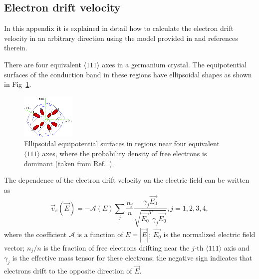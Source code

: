 \documentclass[epj]{svjour}
\begin{document}
\begin{appendices}

\section{Electron drift velocity}
\label{s:elec} 
\setcounter{equation}{0}
\renewcommand{\theequation}{A.\arabic{equation}}
\setcounter{figure}{0}
\renewcommand{\thefigure}{A.\arabic{figure}}
\setcounter{footnote}{0}

In this appendix it is explained in detail how to calculate the
electron drift velocity in an arbitrary direction using the model
provided in \cite{miha} and references therein.

There are four equivalent $\langle 111 \rangle$ axes in a germanium
crystal. The equipotential surfaces of the conduction band in these
regions have ellipsoidal shapes as shown in Fig~\ref{f:valley}.

\begin{figure}[htpb]
\centering
\includegraphics[width=0.6\linewidth]{valleys}   
\caption{Ellipsoidal equipotential surfaces in regions near four
equivalent $\langle 111 \rangle$ axes, where the probability density
of free electrons is dominant (taken from Ref.~\cite{bart}).}
\label{f:valley} 
\end{figure} 

The dependence of the electron drift velocity on the electric field
can be written as
\begin{equation} 
\label{e:ed} 
\vec{v}_{e}(\vec{E}) = - \mathcal{A}(E) \sum_{j} \frac{n_{j}}{n} 
\frac{\gamma_{j}\vec{E_{0}}}
{\sqrt{\vec{E_{0}}^{T}\gamma_{j}\vec{E_{0}}}}, 
j=1,2,3,4,
\end{equation} 
where the coefficient $\mathcal{A}$ is a function of $E = |\vec{E}|$;
$\vec{E_{0}}$ is the normalized electric field vector; $n_{j}/n$ is
the fraction of free electrons drifting near the $j$-th $\langle 111
\rangle$ axis and $\gamma_{j}$ is the effective mass tensor for these
electrons; the negative sign indicates that electrons drift to the
opposite direction of $\vec{E}$.


\end{appendices}
\end{document}
